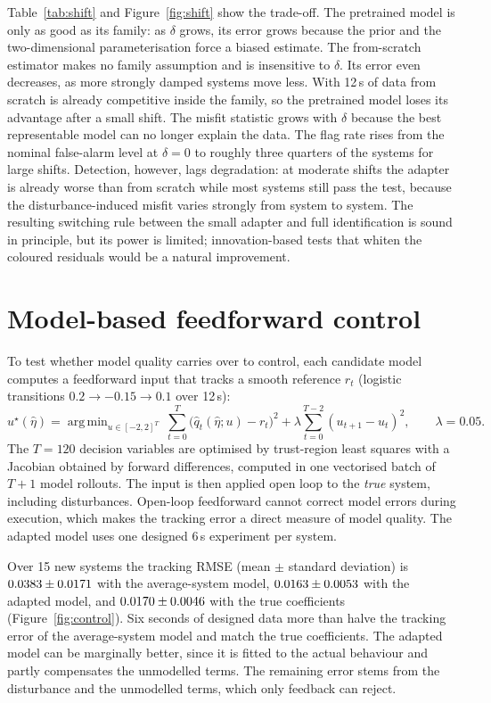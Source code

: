 \documentclass[11pt,a4paper]{article}
\DeclareMathOperator*{\argmin}{arg\,min}
\begin{document}
Table~\ref{tab:shift} and Figure~\ref{fig:shift} show the trade-off. The pretrained model is only
as good as its family: as $\delta$ grows, its error grows because the prior and the
two-dimensional parameterisation force a biased estimate. The from-scratch estimator makes no
family assumption and is insensitive to $\delta$. Its error even decreases, as more strongly damped
systems move less. With 12\,s of data from scratch is already competitive inside the family, so the
pretrained model loses its advantage after a small shift. The misfit statistic grows with $\delta$
because the best representable model can no longer explain the data. The flag rate rises from the
nominal false-alarm level at $\delta=0$ to roughly three quarters of the systems for large shifts.
Detection, however, lags degradation: at moderate shifts the adapter is already worse than from
scratch while most systems still pass the test, because the disturbance-induced misfit varies
strongly from system to system. The resulting switching rule between the small adapter and full
identification is sound in principle, but its power is limited; innovation-based tests that
whiten the coloured residuals would be a natural improvement.

\section{Model-based feedforward control}\label{sec:control}

To test whether model quality carries over to control, each candidate model computes a
feedforward input that tracks a smooth reference $r_t$ (logistic transitions
$0.2\to-0.15\to0.1$ over 12\,s):
\begin{equation}\label{eq:ff}
  u^\star(\hat\eta)=\argmin_{u\in[-2,2]^{T}}\ \sum_{t=0}^{T}\big(\hat q_t(\hat\eta;u)-r_t\big)^2+\lambda\sum_{t=0}^{T-2}(u_{t+1}-u_t)^2,
  \qquad\lambda=0.05 .
\end{equation}
The $T=120$ decision variables are optimised by trust-region least squares with a Jacobian obtained
by forward differences, computed in one vectorised batch of $T+1$ model rollouts. The input is then
applied open loop to the \emph{true} system, including disturbances. Open-loop feedforward cannot
correct model errors during execution, which makes the tracking error a direct measure of model
quality. The adapted model uses one designed 6\,s experiment per system.

Over 15 new systems the tracking RMSE (mean $\pm$ standard deviation) is $0.0383 \pm 0.0171$ with the
average-system model, $0.0163 \pm 0.0053$ with the adapted model, and $0.0170 \pm 0.0046$ with the true
coefficients (Figure~\ref{fig:control}). Six seconds of designed data more than halve the tracking
error of the average-system model and match the true coefficients. The adapted model can be
marginally better, since it is fitted to the actual behaviour and partly compensates the
unmodelled terms. The remaining error stems from the disturbance and the unmodelled terms, which
only feedback can reject.
\end{document}
